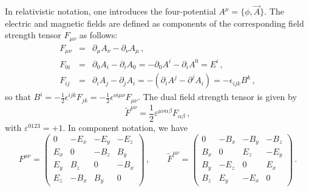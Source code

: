 In relativistic notation, one introduces the four-potential 
$A^{\mu}= \{\phi, \vec{A}\}$. The electric and magnetic fields are
defined as components of the corresponding field strength tensor
$F_{\mu\nu}$ as follows:
\begin{eqnarray}
F_{\mu \nu} & = &\partial_{\mu}A_{\nu} - \partial_{\nu}A_{\mu}\,,
\nonumber \\
F_{0i} & = &\partial_{0}A_{i} - \partial_{i}A_{0} =
- \partial_{0}A^{i} - \partial_{i}A^{0} = E^{i}\,,\nonumber \\
F_{ij} & = & \partial_{i}A_{j} - \partial_{j}A_{i} =
- (\partial_{i}A^{j} - \partial^{j}A_{i}) =
-\epsilon_{ijk} B^{k}\,,
\label{III}
\end{eqnarray}
so that $B^i=-\frac{1}{2}\epsilon^{ijk}F_{jk}=-\frac{1}{2}
\epsilon^{oi\mu\nu}F_{\mu\nu}$. The dual field strength tensor is
given by   
$$
\widetilde F^{\mu \nu} = \frac{1}{2} \varepsilon^{\mu \nu \alpha
\beta} F_{\alpha \beta}\,,
$$
with $\varepsilon^{0123}=+1$. In component notation, we have 
\begin{equation}
F^{\mu \nu} =
\left(
\begin{array}{cccc}
0 & -E_{x} & -E_{y} & -E_{z}  \\
E_{x} & 0 & -B_{z} & B_{y} \\
E_{y} & B_{z} & 0 & -B_{x} \\
E_{z} & -B_{x} & B_{y} & 0
\end{array}
\right)\,,
\qquad
\widetilde F^{\mu \nu} =
\left(
\begin{array}{cccc}
0 & -B_{x} & -B_{y} & -B_{z} \\
B_{x} & 0 & E_{z} & -E_{y} \\
B_{y} & -E_{z} & 0 & E_{x} \\
B_{z} & E_{y} & -E_{x} & 0
\end{array}
\right)\,.
\label{IV}
\end{equation}

